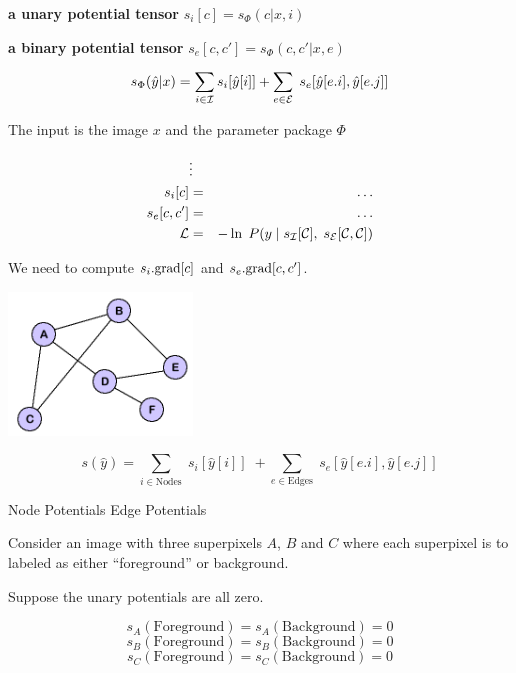 {\vfill {\bf a unary potential tensor} $s_i[c] = s_\Phi(c|x,i)$

\vfill
{\bf a binary potential tensor} $s_e[c,c'] = s_\Phi(c,c'|x,e)$

\vfill
$$s_\Phi(\hat{y}|x) = \sum_{i \in {\cal I}} s_i[\hat{y}[i]] + \sum_{e \in {\cal E}}\;s_e[\hat{y}[e.i],\hat{y}[e.j]]$$


The input is the image $x$ and the parameter package $\Phi$

\begin{eqnarray*}
 & \vdots & \\
s_i[c] & = & \ldots \\
s_e[c,c'] & = & \ldots \\
{\cal L} & = & - \ln\; P(y\;|\;s_{\cal I}[{\cal C}],\;s_{\cal E}[{\cal C}, {\cal C}])
\end{eqnarray*}

\vfill
We need to compute $s_i.\mathrm{grad}[c]$ and $s_e.\mathrm{grad}[c,c']$.


\centerline{\includegraphics[height= 1.5in]{../images/Graph}}

$$s(\hat{y}) = \sum_{i \in \mathrm{Nodes}}\; s_i[\hat{y}[i]]\; + \sum_{e \in \mathrm{Edges}}\;s_e[\hat{y}[e.i],\hat{y}[e.j]]$$

\vfill
\centerline{Node Potentials \hspace{4em}Edge Potentials}


Consider an image with three superpixels $A$, $B$ and $C$ where
each superpixel is to labeled as either ``foreground'' or background.

\vfill
Suppose the unary potentials are all zero.

\vfill
$$s_A(\mathrm{Foreground}) = s_A(\mathrm{Background}) = 0$$
$$s_B(\mathrm{Foreground}) = s_B(\mathrm{Background}) = 0$$
$$s_C(\mathrm{Foreground}) = s_C(\mathrm{Background}) = 0$$



}
